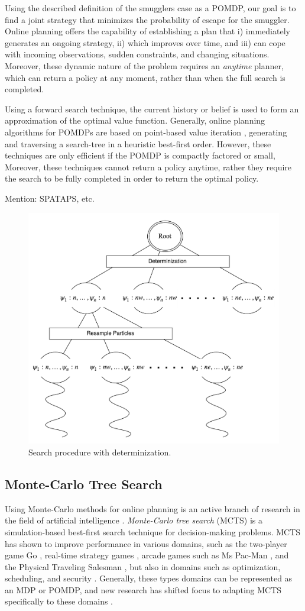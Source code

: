 \documentclass[conference]{IEEEtran}
\begin{document}
Using the described definition of the smugglers case as a POMDP, our goal is to find a joint strategy that minimizes the probability of escape for the smuggler. Online planning offers the capability of establishing a plan that i) immediately generates an ongoing strategy, ii) which improves over time, and iii) can cope with incoming observations, sudden constraints, and changing situations. Moreover, these dynamic nature of the problem requires an {\it anytime} planner, which can return a policy at any moment, rather than when the full search is completed.

Using a forward search technique, the current history or belief is used to form an approximation of the optimal value function. Generally, online planning algorithms for POMDPs are based on point-based value iteration \cite{pineau2006anytime,ross2008online}, generating and traversing a search-tree in a heuristic best-first order. However, these techniques are only efficient if the POMDP is compactly factored or small, Moreover, these techniques cannot return a policy anytime, rather they require the search to be fully completed in order to return the optimal policy.

{\red Mention: SPATAPS, etc.}

\begin{figure}
\begin{center}
 \includegraphics[width=.45\textwidth]{img/searchtree.png}
 \caption{Search procedure with determinization.}\label{fig:searchtree}
\end{center}
\end{figure}

\subsection{Monte-Carlo Tree Search}
\label{sub:mcts}

Using Monte-Carlo methods for online planning is an active branch of research in the field of artificial intelligence \cf \cite{browne2012survey}. {\it Monte-Carlo tree search} (MCTS) \cite{coulom2007efficient,kocsis2006bandit} is a simulation-based best-first search technique for decision-making problems. MCTS has shown to improve performance in various domains, such as the two-player game Go \cite{lee2010current}, real-time strategy games \cite{browne2012survey}, arcade games such as Ms Pac-Man \cite{realtime2014}, and the Physical Traveling Salesman \cite{powleytsp}, but also in domains such as optimization, scheduling, and security \cite{browne2012survey}. Generally, these types domains can be represented as an MDP or POMDP, and new research has shifted focus to adapting MCTS specifically to these domains \cite{silver2010monte,Feldman12BRUE}. 
\end{document}
